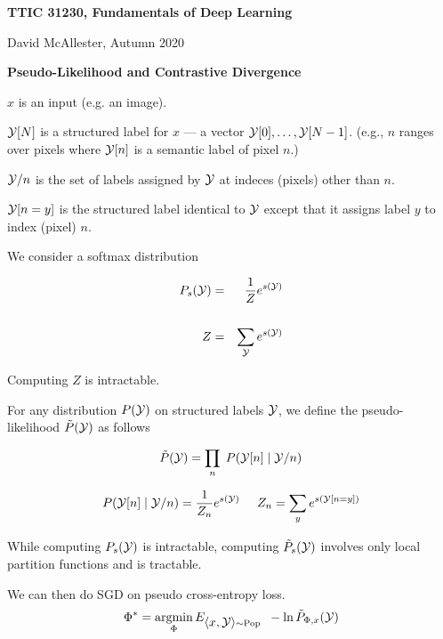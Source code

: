 




{\Huge

  \centerline{\bf TTIC 31230, Fundamentals of Deep Learning}
  \bigskip
  \centerline{David McAllester, Autumn 2020}
  \vfill
  \vfill
  \centerline{\bf Pseudo-Likelihood and Contrastive Divergence}
\vfill
\vfill
\vfill


$x$ is an input (e.g. an image).

\vfill
${\cal Y} [N]$ is a structured label for $x$ --- a vector ${\cal Y}[0],\ldots,{\cal Y}[N-1]$. (e.g., $n$ ranges over pixels where ${\cal Y}[n]$ is a semantic label of pixel $n$.)

\vfill
${\cal Y}/n$ is the set of labels assigned by ${\cal Y}$ at indeces (pixels) other than $n$.

\vfill
${\cal Y}[n=y]$ is the structured label identical to ${\cal Y}$ except that it assigns label $y$ to index (pixel) $n$.


\vfill
We consider a softmax distribution

\vfill
\begin{eqnarray*}
P_s({\cal Y}) & = & \frac{1}{Z}e^{s({\cal Y})} \\
\\
Z & = & \sum_{\cal Y} e^{s({\cal Y})}
\end{eqnarray*}

\vfill
Computing $Z$ is intractable.


For any distribution $P({\cal Y})$ on structured labels ${\cal Y}$,
we define the {\color{red} pseudo-likelihood}  $\tilde{P}({\cal Y})$ as follows

{\color{red} $$\tilde{P}({\cal Y}) = \prod_n\;P({\cal Y}[n]\;|\; {\cal Y}/n)$$}

\vfill
$$P({\cal Y}[n]\;|\;{\cal Y}/n) = \frac{1}{Z_n}e^{s({\cal Y})}\;\;\;\;\;Z_n = \sum_{y} e^{s({\cal Y}[n=y])}$$

\vfill
While computing $P_s({\cal Y})$ is intractable, computing $\tilde{P}_s({\cal Y})$ involves only local partition functions and is tractable.


We can then do SGD on pseudo cross-entropy loss.
\vfill
{\color{red} $$\Phi^* = \operatorname*{argmin}_\Phi E_{{\mbox{$\langle x,{\cal Y}\rangle$}} \sim \mathrm{Pop}}\;\;-\ln \tilde{P}_{\Phi,x}({\cal Y})$$}

}
